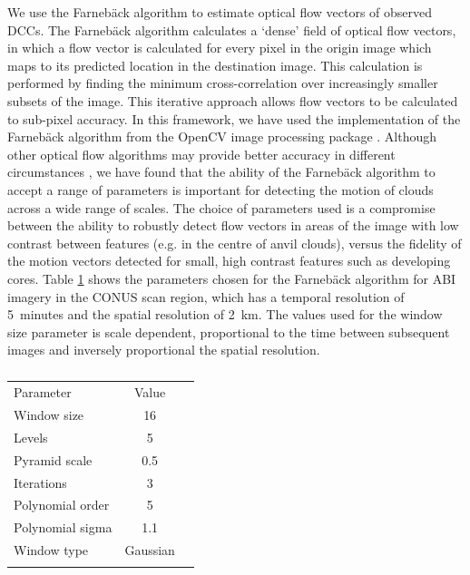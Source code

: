 \documentclass[amt, manuscript]{copernicus}
\begin{document}
We use the Farnebäck algorithm \citep{farneback_two-frame_2003} to estimate optical flow vectors of observed DCCs.
The Farnebäck algorithm calculates a `dense' field of optical flow vectors, in which a flow vector is calculated for every pixel in the origin image which maps to its predicted location in the destination image.
This calculation is performed by finding the minimum cross-correlation over increasingly smaller subsets of the image.
This iterative approach allows flow vectors to be calculated to sub-pixel accuracy.
In this framework, we have used the implementation of the Farnebäck algorithm from the OpenCV image processing package \citep{opencv_library}.
Although other optical flow algorithms may provide better accuracy in different circumstances \citep{baker_database_2011}, we have found that the ability of the Farnebäck algorithm to accept a range of parameters is important for detecting the motion of clouds across a wide range of scales.
The choice of parameters used is a compromise between the ability to robustly detect flow vectors in areas of the image with low contrast between features (e.g. in the centre of anvil clouds), versus the fidelity of the motion vectors detected for small, high contrast features such as developing cores.
Table \ref{table:parameters} shows the parameters chosen for the Farnebäck algorithm for ABI imagery in the CONUS scan region, which has a temporal resolution of 5~minutes and the spatial resolution of 2~km.
The values used for the window size parameter is scale dependent, proportional to the time between subsequent images and inversely proportional the spatial resolution.
\begin{table}[t]
\caption{}
\label{table:parameters}
\begin{tabular}{lcr}
\tophline
Parameter        & Value    \\ 
\middlehline
Window size      & 16       \\
Levels           & 5        \\
Pyramid scale    & 0.5      \\
Iterations       & 3        \\
Polynomial order & 5        \\
Polynomial sigma & 1.1      \\
Window type      & Gaussian \\
\bottomhline
\end{tabular}
\end{table}
\end{document}
